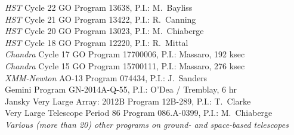 \documentclass[11pt]{article}
\begin{document}
{\textbullet~~\textit{HST}  Cycle 22 GO Program 13638, P.I.: M.~Bayliss\\
\textbullet~~\textit{HST}  Cycle 21 GO Program 13422, P.I.: R.~Canning\\
\textbullet~~\textit{HST}  Cycle 20 GO Program 13023, P.I.: M.~Chiaberge\\
\textbullet~~\textit{HST}  Cycle 18 GO Program 12220, P.I.: R.~Mittal\\
\textbullet~~\textit{Chandra} Cycle 17 GO Program 17700006, P.I.: Massaro, 192 ksec\\
\textbullet~~\textit{Chandra} Cycle 15 GO Program 15700111, P.I.: Massaro, 276 ksec\\
\textbullet~~\textit{XMM-Newton}  AO-13 Program 074434, P.I.: J.~Sanders\\
\textbullet~~Gemini Program GN-2014A-Q-55, P.I.: O'Dea / Tremblay, 6 hr\\
\textbullet~~Jansky Very Large Array:  2012B Program 12B-289, P.I.: T.~Clarke\\
\textbullet~~Very Large Telescope Period 86 Program 086.A-0399, P.I.: M.~Chiaberge\\
\textbullet~~\textit{Various (more than 20) other programs on ground- and space-based telescopes}
}\\
\end{document}
